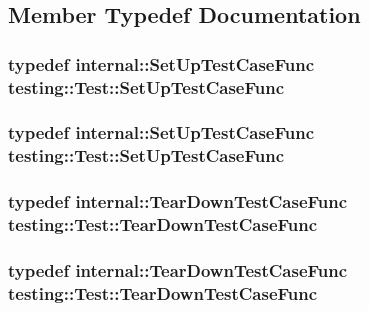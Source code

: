 \subsection{Member Typedef Documentation}
\hypertarget{classtesting_1_1_test_a5f2a051d1d99c9b784c666c586186cf9}{
\subsubsection[{Set\-Up\-Test\-Case\-Func}]{\setlength{\rightskip}{0pt plus 5cm}typedef internal\-::\-Set\-Up\-Test\-Case\-Func {\bf testing\-::\-Test\-::\-Set\-Up\-Test\-Case\-Func}}}\label{classtesting_1_1_test_a5f2a051d1d99c9b784c666c586186cf9}
\hypertarget{classtesting_1_1_test_a5f2a051d1d99c9b784c666c586186cf9}{
\subsubsection[{Set\-Up\-Test\-Case\-Func}]{\setlength{\rightskip}{0pt plus 5cm}typedef internal\-::\-Set\-Up\-Test\-Case\-Func {\bf testing\-::\-Test\-::\-Set\-Up\-Test\-Case\-Func}}}\label{classtesting_1_1_test_a5f2a051d1d99c9b784c666c586186cf9}
\hypertarget{classtesting_1_1_test_aa0f532e93b9f3500144c53f31466976c}{
\subsubsection[{Tear\-Down\-Test\-Case\-Func}]{\setlength{\rightskip}{0pt plus 5cm}typedef internal\-::\-Tear\-Down\-Test\-Case\-Func {\bf testing\-::\-Test\-::\-Tear\-Down\-Test\-Case\-Func}}}\label{classtesting_1_1_test_aa0f532e93b9f3500144c53f31466976c}
\hypertarget{classtesting_1_1_test_aa0f532e93b9f3500144c53f31466976c}{
\subsubsection[{Tear\-Down\-Test\-Case\-Func}]{\setlength{\rightskip}{0pt plus 5cm}typedef internal\-::\-Tear\-Down\-Test\-Case\-Func {\bf testing\-::\-Test\-::\-Tear\-Down\-Test\-Case\-Func}}}\label{classtesting_1_1_test_aa0f532e93b9f3500144c53f31466976c}


